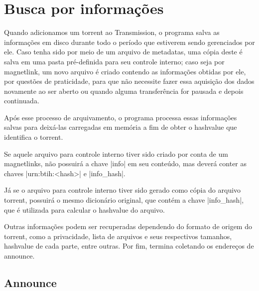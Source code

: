 \section{Busca por informações}

Quando adicionamos um \gls*{torrent} ao Transmission, o programa salva as informações
em disco durante todo o período que estiverem sendo gerenciados por ele. Caso tenha
sido por meio de um arquivo de \glspl*{metadata}, uma cópia deste é salva em uma pasta
pré-definida para seu controle interno; caso seja por \gls*{magnetlink}, um novo
arquivo é criado contendo as informações obtidas por ele, por questões de praticidade,
para que não necessite fazer essa aquisição dos dados novamente ao ser aberto ou quando
alguma transferência for pausada e depois continuada.

Após esse processo de arquivamento, o programa processa essas informações salvas para
deixá-las carregadas em memória a fim de obter o \gls*{hashvalue} que identifica o
\gls*{torrent}.


Se aquele arquivo para controle interno tiver sido criado por conta de um
\glspl*{magnetlink}, não possuirá a chave \bverb|info| em seu conteúdo, mas deverá
conter as chaves \bverb|urn:btih:<hash>| e \bverb|info_hash|.


Já se o arquivo para controle interno tiver sido gerado como cópia do arquivo torrent,
possuirá o mesmo dicionário original, que contém a chave \bverb|info_hash|, que é
utilizada para calcular o \gls*{hashvalue} do arquivo.


Outras informações podem ser recuperadas dependendo do formato de origem do
\gls*{torrent}, como a privacidade, lista de arquivos e seus respectivos tamanhos,
\gls*{hashvalue} de cada parte, entre outras. Por fim, termina coletando os endereços de
\gls{announce}.


\subsection*{Announce}

